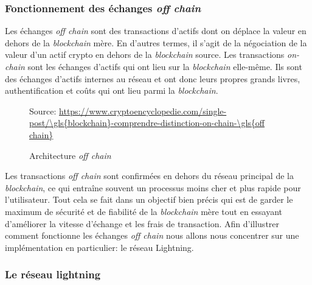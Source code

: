 \subsubsection{Fonctionnement des échanges \textit{\gls{off chain}}}
Les échanges \textit{\gls{off chain}} sont des transactions d'\gls{actif}s dont on déplace la valeur en dehors de la \textit{\gls{blockchain}} mère. En d’autres termes, il s’agit de la négociation de la valeur d’un \gls{actif} crypto en dehors de la \textit{\gls{blockchain}} source. Les transactions \textit{on-chain} sont les échanges d'\gls{actif}s qui ont lieu sur la \textit{\gls{blockchain}} elle-même.
Ils sont des échanges d’\gls{actif}s internes au réseau et ont donc leurs propres grands livres, authentification et coûts qui ont lieu parmi la \textit{\gls{blockchain}}.
\begin{figure}[h!]
    \centering
    {\scriptsize Source: \url{https://www.cryptoencyclopedie.com/single-post/\gls{blockchain}-comprendre-distinction-on-chain-\gls{off chain}}}
    \caption{Architecture \textit{\gls{off chain}}}
    \label{fig:offchain}
\end{figure}
Les transactions \textit{\gls{off chain}} sont confirmées en dehors du réseau principal de la \textit{\gls{blockchain}}, ce qui entraîne souvent un processus moins cher et plus rapide pour l’utilisateur. 
Tout cela se fait dans un objectif bien précis qui est de garder le maximum de sécurité et de fiabilité de la \textit{\gls{blockchain}} mère tout en essayant d'améliorer la vitesse d'échange et les frais de transaction.
Afin d'illustrer comment fonctionne les échanges \textit{\gls{off chain}} nous allons nous concentrer sur une implémentation en particulier: le réseau Lightning. 

\subsubsection{Le réseau lightning}

